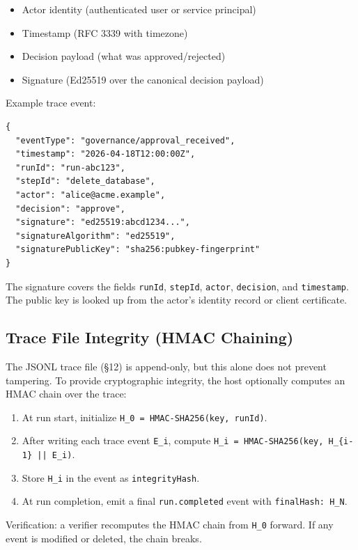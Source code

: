 \begin{itemize}
  \item Actor identity (authenticated user or service principal)
  \item Timestamp (RFC 3339 with timezone)~\cite{rfc3339}
  \item Decision payload (what was approved/rejected)
  \item Signature (Ed25519 over the canonical decision payload)
\end{itemize}

Example trace event:

\begin{verbatim}
{
  "eventType": "governance/approval_received",
  "timestamp": "2026-04-18T12:00:00Z",
  "runId": "run-abc123",
  "stepId": "delete_database",
  "actor": "alice@acme.example",
  "decision": "approve",
  "signature": "ed25519:abcd1234...",
  "signatureAlgorithm": "ed25519",
  "signaturePublicKey": "sha256:pubkey-fingerprint"
}
\end{verbatim}

The signature covers the fields \texttt{runId}, \texttt{stepId},
\texttt{actor}, \texttt{decision}, and \texttt{timestamp}.  The public key is
looked up from the actor's identity record or client certificate.

\subsection{Trace File Integrity (HMAC Chaining)}

The JSONL trace file (§12) is append-only, but this alone does not prevent
tampering.  To provide cryptographic integrity, the host optionally computes an
HMAC chain over the trace:

\begin{enumerate}
  \item At run start, initialize \texttt{H\_0 = HMAC-SHA256(key, runId)}.
  \item After writing each trace event \texttt{E\_i}, compute
        \texttt{H\_i = HMAC-SHA256(key, H\_\{i-1\} || E\_i)}.
  \item Store \texttt{H\_i} in the event as \texttt{integrityHash}.
  \item At run completion, emit a final \texttt{run.completed} event with
        \texttt{finalHash: H\_N}.
\end{enumerate}

Verification: a verifier recomputes the HMAC chain from \texttt{H\_0} forward.
If any event is modified or deleted, the chain breaks.

